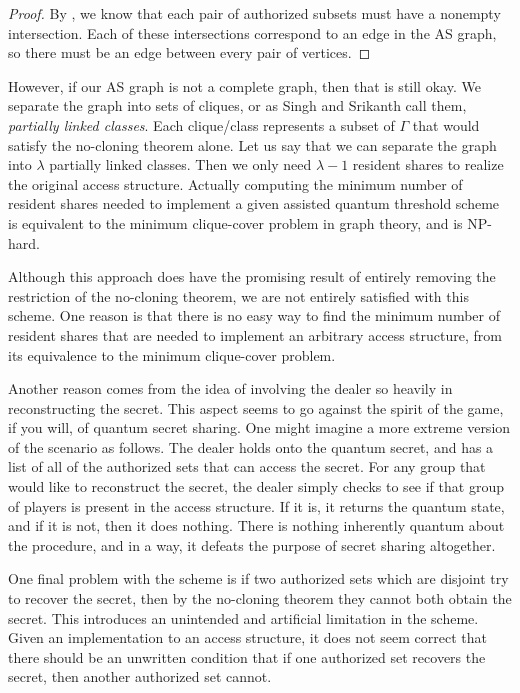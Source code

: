 \begin{proof}
    By , we know that each pair of authorized subsets must have a nonempty intersection. Each of these intersections correspond to an edge in the AS graph, so there must be an edge between every pair of vertices.
\end{proof}

However, if our AS graph is not a complete graph, then that is still okay. We separate the graph into sets of cliques, or as Singh and Srikanth call them, \textit{partially linked classes}. Each clique/class represents a subset of $\Gamma$ that would satisfy the no-cloning theorem alone. Let us say that we can separate the graph into $\lambda$ partially linked classes. Then we only need $\lambda - 1$ resident shares to realize the original access structure. Actually computing the minimum number of resident shares needed to implement a given assisted quantum threshold scheme is equivalent to the minimum clique-cover problem in graph theory, and is NP-hard.

Although this approach does have the promising result of entirely removing the restriction of the no-cloning theorem, we are not entirely satisfied with this scheme. One reason is that there is no easy way to find the minimum number of resident shares that are needed to implement an arbitrary access structure, from its equivalence to the minimum clique-cover problem.

Another reason comes from the idea of involving the dealer so heavily in reconstructing the secret. This aspect seems to go against the spirit of the game, if you will, of quantum secret sharing. One might imagine a more extreme version of the scenario as follows. The dealer holds onto the quantum secret, and has a list of all of the authorized sets that can access the secret. For any group that would like to reconstruct the secret, the dealer simply checks to see if that group of players is present in the access structure. If it is, it returns the quantum state, and if it is not, then it does nothing. There is nothing inherently quantum about the procedure, and in a way, it defeats the purpose of secret sharing altogether.

One final problem with the scheme is if two authorized sets which are disjoint try to recover the secret, then by the no-cloning theorem they cannot both obtain the secret. This introduces an unintended and artificial limitation in the scheme. Given an implementation to an access structure, it does not seem correct that there should be an unwritten condition that if one authorized set recovers the secret, then another authorized set cannot. 

